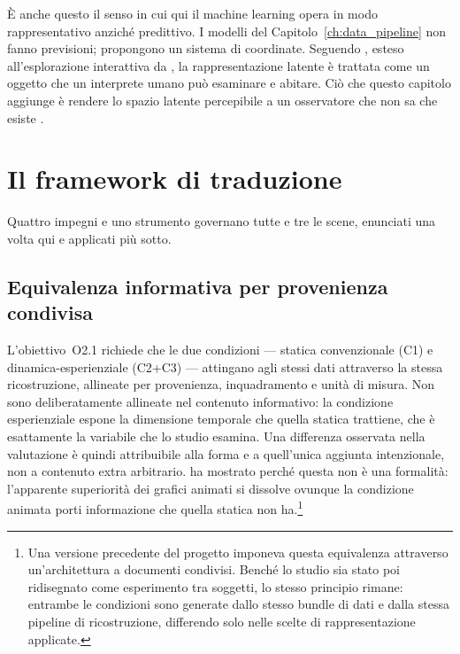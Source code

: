 È anche questo il senso in cui qui il machine learning opera in modo rappresentativo anziché predittivo. I modelli del Capitolo~\ref{ch:data_pipeline} non fanno previsioni; propongono un sistema di coordinate. Seguendo \textcite{iten2020}, esteso all'esplorazione interattiva da \textcite{camps2019}, la rappresentazione latente è trattata come un oggetto che un interprete umano può esaminare e abitare. Ciò che questo capitolo aggiunge è rendere lo spazio latente percepibile a un osservatore che non sa che esiste \parencite{sacha2018}.

\section{Il framework di traduzione}
\label{sec:translate-framework}

Quattro impegni e uno strumento governano tutte e tre le scene, enunciati una volta qui e applicati più sotto.

\subsection{Equivalenza informativa per provenienza condivisa}
\label{subsec:equivalence}

L'obiettivo~O2.1 richiede che le due condizioni --- statica convenzionale (C1) e dinamica-esperienziale (C2+C3) --- attingano agli stessi dati attraverso la stessa ricostruzione, allineate per provenienza, inquadramento e unità di misura. Non sono deliberatamente allineate nel contenuto informativo: la condizione esperienziale espone la dimensione temporale che quella statica trattiene, che è esattamente la variabile che lo studio esamina. Una differenza osservata nella valutazione è quindi attribuibile alla forma e a quell'unica aggiunta intenzionale, non a contenuto extra arbitrario. \textcite{tversky2002} ha mostrato perché questa non è una formalità: l'apparente superiorità dei grafici animati si dissolve ovunque la condizione animata porti informazione che quella statica non ha.\footnote{Una versione precedente del progetto imponeva questa equivalenza attraverso un'architettura a documenti condivisi. Benché lo studio sia stato poi ridisegnato come esperimento tra soggetti, lo stesso principio rimane: entrambe le condizioni sono generate dallo stesso bundle di dati e dalla stessa pipeline di ricostruzione, differendo solo nelle scelte di rappresentazione applicate.}

